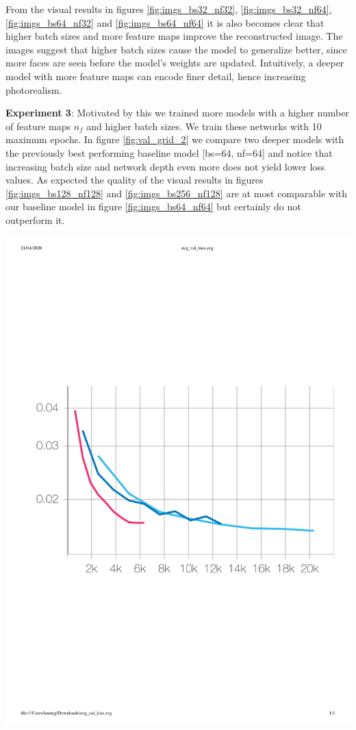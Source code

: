 \documentclass{article}
\newenvironment{Figure}
  {\par\medskip\noindent\minipage{\linewidth}}
  {\endminipage\par\medskip}
\begin{document}
\begin{multicols}{2}
From the visual results in figures \ref{fig:imgs_bs32_nf32}, \ref{fig:imgs_bs32_nf64}, 
	\ref{fig:imgs_bs64_nf32} and \ref{fig:imgs_bs64_nf64} it is also becomes clear that higher batch sizes and more feature maps improve the reconstructed image. The images suggest that higher batch sizes cause the model to generalize better, since more faces are seen before the model's weights are updated. Intuitively, a deeper model with more feature maps can encode finer detail, hence increasing photorealism. 
	
\textbf{Experiment 3}: Motivated by this we trained more models with a higher number of feature maps $n_f$ and higher batch sizes. We train these networks with 10 maximum epochs. In figure \ref{fig:val_grid_2} we compare two deeper models with the previously best performing baseline model [bs=64, nf=64] and notice that increasing batch size and network depth even more does not yield lower loss values. As expected the quality of the visual results in figures \ref{fig:imgs_bs128_nf128} and \ref{fig:imgs_bs256_nf128} are at most comparable with our baseline model in figure \ref{fig:imgs_bs64_nf64} but certainly do not outperform it.

\begin{Figure}
	\centering 
	\includegraphics[width=\linewidth]{figures/avg_val_loss_2}
	\label{fig:val_grid_2}
\end{Figure}


\end{multicols}
\end{document}
